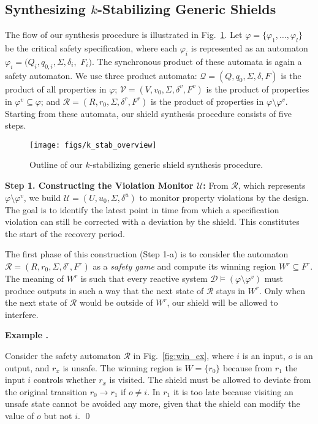 \documentclass{llncs}
\newcounter{exacounter}
\newenvironment{exa}{
\refstepcounter{exacounter}
\smallskip\noindent
\textbf{Example \theexacounter.}
}{\vspace{2mm}}
\newcommand{\design}{\mathcal{D}}
\newcommand{\dalph}{\Sigma}
\newcommand{\spec}{\varphi}
\newcommand{\specv}{\varphi^v}
\begin{document}
\subsection{Synthesizing $k$-Stabilizing Generic Shields}
\label{sec:k-stab}

The flow of our synthesis procedure is illustrated in 
Fig.~\ref{fig:k-stab}.  Let $\spec = \{\spec_1,\ldots,\spec_l\}$ be the 
critical safety specification, where each $\spec_i$ is represented as 
an automaton $\spec_i = (Q_i, q_{0,i}, \dalph, \delta_i,$ $F_i)$.  The 
synchronous product of these automata is again a safety automaton.  We 
use three product automata:
$\mathcal{Q} = (Q, q_{0}, \dalph, \delta, F)$ is the product of
all properties in $\spec$;
$\mathcal{V} = (V, v_{0}, \dalph, \delta^v, F^v)$ is the product
of properties in $\specv \subseteq \spec$; and 
$\mathcal{R} = (R, r_{0}, \dalph, \delta^r, F^r)$ is the product
of properties in $\spec\setminus\specv$.
Starting from these automata, our shield synthesis procedure consists of 
five steps.

\begin{figure}[tb]
  \begin{center}
    \texttt{[image: figs/k\_stab\_overview]}
    \caption{Outline of our $k$-stabilizing generic shield synthesis procedure.}
    \label{fig:k-stab}
  \end{center}
\end{figure}



\noindent
\textbf{Step 1. Constructing the Violation Monitor $\mathcal{U}$:}
From $\mathcal{R}$, which represents $\spec\setminus\specv$, we build 
$\mathcal{U} = (U, u_0, \dalph, \delta^u)$ to monitor property 
violations by the design.  The goal is to identify the latest point in 
time from which a specification violation can still be corrected with a 
deviation by the shield.  This constitutes the start of the recovery 
period.

The first phase of this construction (Step 1-a) is to consider the 
automaton $\mathcal{R} = (R, r_{0}, \dalph, \delta^r, F^r)$  as a 
\emph{safety game} and compute its winning region $W^r\subseteq F^r$.  
The meaning of $W^r$ is such that every reactive system 
$\design\models(\spec \setminus \specv)$ must produce outputs in such a 
way that the next state of $\mathcal{R}$ stays in $W^r$.  Only when the 
next state of $\mathcal{R}$ would be outside of $W^r$, our shield will 
be allowed to interfere.

\begin{exa}
Consider the safety automaton $\mathcal{R}$ in Fig.~\ref{fig:win_ex}, 
where $i$ is an input, $o$ is an output, and $r_x$ is unsafe.  The 
winning region is $W=\{r_0\}$ because from $r_1$ the input $i$ controls 
whether $r_x$ is visited.  The shield must be allowed to deviate from 
the original transition $r_0\rightarrow r_1$ if $o\neq i$. In $r_1$ it 
is too late because visiting an unsafe state cannot be avoided any more, 
given that the shield can modify the value of $o$ but not $i$.  \qed
\end{exa}
\end{document}
